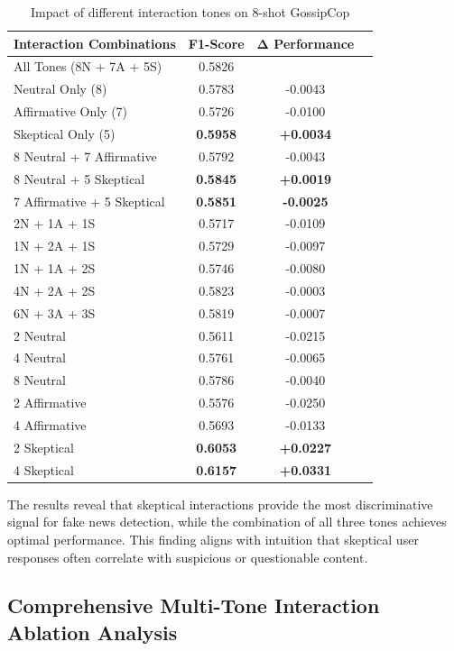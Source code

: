 \begin{table}[htbp]
\centering
\caption{Impact of different interaction tones on 8-shot GossipCop}
\label{tab:ablation_tones_gossipcop}
\begin{tabular}{lccc}
\toprule
\textbf{Interaction Combinations} & \textbf{F1-Score} & \textbf{Δ Performance} \\
\midrule
All Tones (8N + 7A + 5S) & 0.5826 & \- \\
\midrule
Neutral Only (8) & 0.5783 & -0.0043 \\
Affirmative Only (7) & 0.5726 & -0.0100 \\
Skeptical Only (5) & \textbf{0.5958} & \textbf{+0.0034} \\
\midrule
8 Neutral + 7 Affirmative & 0.5792 & -0.0043 \\
8 Neutral + 5 Skeptical & \textbf{0.5845} & \textbf{+0.0019} \\
7 Affirmative + 5 Skeptical & \textbf{0.5851} & \textbf{-0.0025} \\
\midrule
2N + 1A + 1S & 0.5717 & -0.0109 \\
1N + 2A + 1S & 0.5729 & -0.0097 \\
1N + 1A + 2S & 0.5746 & -0.0080 \\
\midrule
4N + 2A + 2S & 0.5823 & -0.0003 \\
6N + 3A + 3S & 0.5819 & -0.0007 \\
\midrule
2 Neutral & 0.5611 & -0.0215 \\
4 Neutral & 0.5761 & -0.0065 \\
8 Neutral & 0.5786 & -0.0040 \\ 
2 Affirmative & 0.5576 & -0.0250 \\
4 Affirmative & 0.5693 & -0.0133 \\
2 Skeptical & \textbf{0.6053} & \textbf{+0.0227} \\
4 Skeptical & \textbf{0.6157} & \textbf{+0.0331} \\
\bottomrule
\end{tabular}
\end{table}

The results reveal that skeptical interactions provide the most discriminative signal for fake news detection, while the combination of all three tones achieves optimal performance. This finding aligns with intuition that skeptical user responses often correlate with suspicious or questionable content.

\subsection{Comprehensive Multi-Tone Interaction Ablation Analysis}

